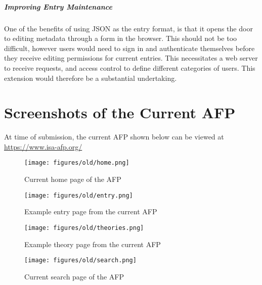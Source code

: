 \documentclass[bsc,frontabs,oneside,singlespacing,parskip,deptreport,logo]{infthesis}
\begin{document}
\paragraph*{Improving Entry Maintenance}

One of the benefits of using JSON as the entry format, is that it opens the door to editing metadata through a form in the browser. This should not be too difficult, however users would need to sign in and authenticate themselves before they receive editing permissions for current entries. This necessitates a web server to receive requests, and access control to define different categories of users. This extension would therefore be a substantial undertaking.





\appendix \label{app:1}

\chapter{Screenshots of the Current AFP}

At time of submission, the current AFP shown below can be viewed at \url{https://www.isa-afp.org/}

\begin{figure}[h]
    \centering
    \texttt{[image: figures/old/home.png]}
    \caption{Current home page of the AFP}

\end{figure}

\begin{figure}[h]
    \centering
    \texttt{[image: figures/old/entry.png]}
    \caption{Example entry page from the current AFP}

\end{figure}

\begin{figure}[h]
    \centering
    \texttt{[image: figures/old/theories.png]}
    \caption{Example theory page from the current AFP}
    \label{afpScriptBrowsing}
\end{figure}

\begin{figure}[h]
    \centering
    \texttt{[image: figures/old/search.png]}
    \caption{Current search page of the AFP}

\end{figure}
\end{document}
